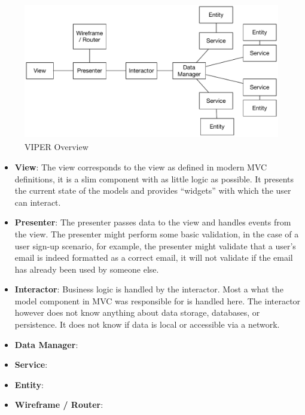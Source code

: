 \begin{figure}[H]
    \centering
    \includegraphics[height=6cm,keepaspectratio]{assets/concept/viper.pdf}
    \caption{VIPER Overview}
    \label{fig:viper}
\end{figure}

\begin{itemize}[label={}]

\item \textbf{View}: The view corresponds to the view as defined in modern MVC definitions, it is a slim component with as little logic as possible. It presents the current state of the models and provides “widgets” with which the user can interact.
\item \textbf{Presenter}: The presenter passes data to the view and handles events from the view. The presenter might perform some basic validation, in the case of a user sign-up scenario, for example, the presenter might validate that a user’s email is indeed formatted as a correct email, it will not validate if the email has already been used by someone else.

\item \textbf{Interactor}: Business logic is handled by the interactor. Most a what the model component in MVC was responsible for is handled here. The interactor however does not know anything about data storage, databases, or persistence. It does not know if data is local or accessible via a network.

\item \textbf{Data Manager}:
\item \textbf{Service}:
\item \textbf{Entity}:
\item \textbf{Wireframe / Router}:

\end{itemize}